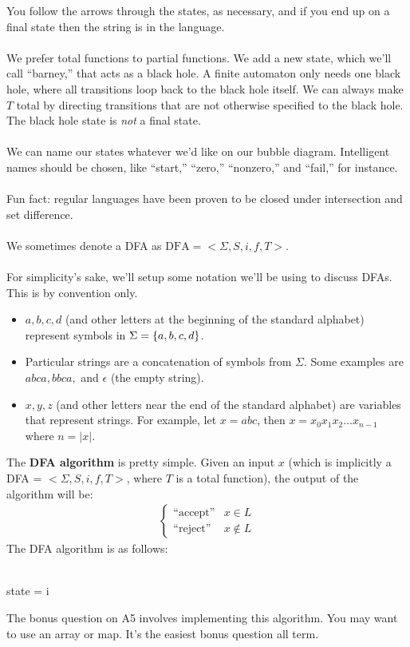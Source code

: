 \documentclass[]{article}
\DeclarePairedDelimiter{\set}{\lbrace}{\rbrace}
\theoremstyle{definition}
\newcommand{\lecture}[1]{\marginpar{{\footnotesize $\leftarrow$ \underline{#1}}}}
\begin{document}
			You follow the arrows through the states, as necessary, and if you end up on a final state then the string is in the language.
			\\ \\
			We prefer total functions to partial functions. We add a new state, which we'll call ``barney,'' that acts as a black hole. A finite automaton only needs one black hole, where all transitions loop back to the black hole itself. We can always make $T$ total by directing transitions that are not otherwise specified to the black hole. The black hole state is \emph{not} a final state.
			\\ \\
			We can name our states whatever we'd like on our bubble diagram. Intelligent names should be chosen, like ``start,'' ``zero,'' ``nonzero,'' and ``fail,'' for instance.
			\\ \\
			Fun fact: regular languages have been proven to be closed under intersection and set difference. \lecture{February 6, 2013}
			\\ \\
			We sometimes denote a DFA as $\text{DFA} = < \Sigma, S, i, f, T >$.
			\\ \\
			For simplicity's sake, we'll setup some notation we'll be using to discuss DFAs. This is by convention only.
			\begin{itemize}
				\item $a, b, c, d$ (and other letters at the beginning of the standard alphabet) represent symbols in $\Sigma = \set{a, b, c, d}$.
				\item Particular strings are a concatenation of symbols from $\Sigma$. Some examples are $abca, bbca,$ and $\epsilon$ (the empty string).
				\item $x, y, z$ (and other letters near the end of the standard alphabet) are variables that represent strings. For example, let $x = abc$, then $x = x_0 x_1 x_2 \ldots x_{n - 1}$ where $n = |x|$.
			\end{itemize}
			The \textbf{DFA algorithm} is pretty simple. Given an input $x$ (which is implicitly a DFA = $< \Sigma, S, i, f, T >$, where $T$ is a total function), the output of the algorithm will be:
			\begin{align*}
				\begin{cases}
					\text{``accept''} & x \in L \\
					\text{``reject''} & x \not \in L
				\end{cases}
			\end{align*}
			The DFA algorithm is as follows: \\ \\
			\begin{algorithm}[H]
				state = i\;
			\end{algorithm}
			\vspace{0.5cm}
			The bonus question on A5 involves implementing this algorithm. You may want to use an array or map. It's the easiest bonus question all term.
\end{document}
